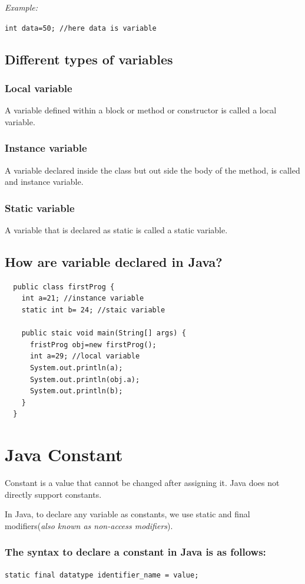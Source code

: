 \documentclass[twocolumn, a4paper]{article}
\begin{document}
\noindent\emph{Example:}

\texttt{int data=50; //here data is variable}

\subsection{Different types of variables}
\subsubsection{Local variable}
A variable defined within a block or method or constructor is called a local
variable.
\subsubsection{Instance variable}
A variable declared inside the class but out side the body of the method, is
called and instance variable.
\subsubsection{Static variable}
A variable that is declared as static is called a static variable.

\subsection{How are variable declared in Java?}
\begin{lstlisting}
  public class firstProg {
    int a=21; //instance variable
    static int b= 24; //staic variable

    public staic void main(String[] args) {
      fristProg obj=new firstProg();
      int a=29; //local variable
      System.out.println(a);
      System.out.println(obj.a);
      System.out.println(b);
    }
  }
\end{lstlisting}

\section{Java Constant}
Constant is a value that cannot be changed after assigning it. Java does not
directly support constants.

In Java, to declare any variable as constants, we use static and final
modifiers(\emph{also known as non-access modifiers}).
\subsubsection{The syntax to declare a constant in Java is as follows:}
\begin{center}
  {\footnotesize\texttt{static final datatype identifier\_name = value;}}
\end{center}
\end{document}
